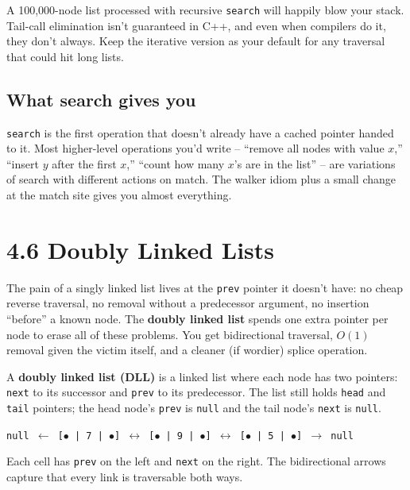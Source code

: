 \documentclass[11pt]{article}
\begin{document}
\begin{warnbox}
A 100{,}000-node list processed with recursive \texttt{search} will
happily blow your stack. Tail-call elimination isn't guaranteed in
C++, and even when compilers do it, they don't always. Keep the
iterative version as your default for any traversal that could hit
long lists.
\end{warnbox}

\subsection{What search gives you}

\begin{ideabox}
\texttt{search} is the first operation that doesn't already have a
cached pointer handed to it. Most higher-level operations you'd
write -- ``remove all nodes with value $x$,'' ``insert $y$ after
the first $x$,'' ``count how many $x$'s are in the list'' -- are
variations of search with different actions on match. The walker
idiom plus a small change at the match site gives you almost
everything.
\end{ideabox}

\section{4.6 Doubly Linked Lists}

The pain of a singly linked list lives at the \texttt{prev}
pointer it doesn't have: no cheap reverse traversal, no removal
without a predecessor argument, no insertion ``before'' a known
node. The \textbf{doubly linked list} spends one extra pointer per
node to erase all of these problems. You get bidirectional
traversal, $O(1)$ removal given the victim itself, and a cleaner
(if wordier) splice operation.

\begin{defnbox}
A \textbf{doubly linked list (DLL)} is a linked list where each
node has two pointers: \texttt{next} to its successor and
\texttt{prev} to its predecessor. The list still holds \texttt{head}
and \texttt{tail} pointers; the head node's \texttt{prev} is
\texttt{null} and the tail node's \texttt{next} is \texttt{null}.
\end{defnbox}

\begin{ideabox}
\texttt{null $\leftarrow$ [$\bullet$ | 7 | $\bullet$] $\leftrightarrow$ [$\bullet$ | 9 | $\bullet$] $\leftrightarrow$ [$\bullet$ | 5 | $\bullet$] $\to$ null}

Each cell has \texttt{prev} on the left and \texttt{next} on the
right. The bidirectional arrows capture that every link is
traversable both ways.
\end{ideabox}
\end{document}
